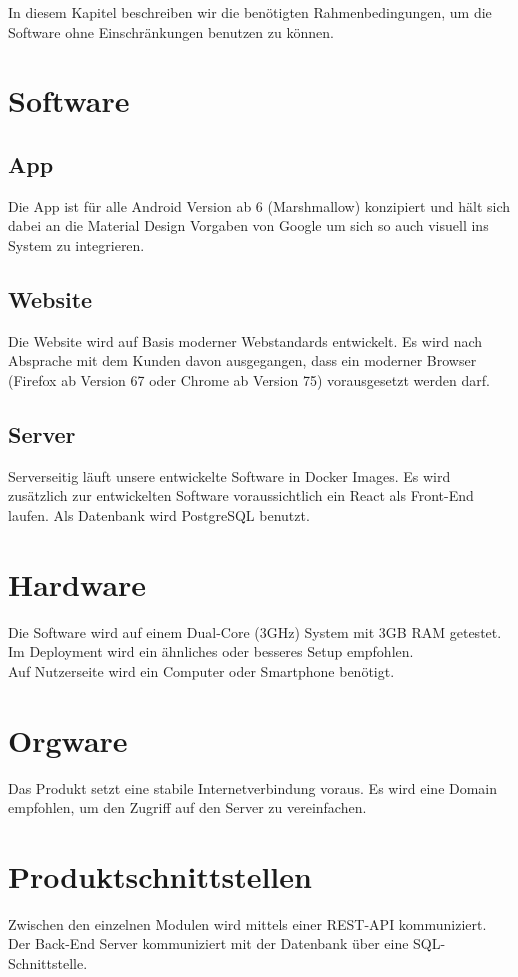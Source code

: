 In diesem Kapitel beschreiben wir die benötigten Rahmenbedingungen, um die Software ohne Einschränkungen benutzen zu können.

\section{Software}

\subsection*{App}
Die App ist für alle Android Version ab 6 (Marshmallow) konzipiert und hält sich dabei an die Material Design Vorgaben von Google um sich so auch visuell ins System zu integrieren.

\subsection*{Website}
Die Website wird auf Basis moderner Webstandards entwickelt. Es wird nach Absprache mit dem Kunden davon ausgegangen, dass ein moderner Browser (Firefox ab Version 67 oder Chrome ab Version 75) vorausgesetzt werden darf.

\subsection*{Server} 
Serverseitig läuft unsere entwickelte Software in Docker Images. Es wird zusätzlich zur entwickelten Software voraussichtlich ein React als Front-End laufen.
Als Datenbank wird PostgreSQL benutzt.

\section{Hardware}
Die Software wird auf einem Dual-Core (3GHz) System mit 3GB RAM getestet. Im Deployment wird ein ähnliches oder besseres Setup empfohlen.\\
Auf Nutzerseite wird ein Computer oder Smartphone benötigt. 
\section{Orgware}

Das Produkt setzt eine stabile Internetverbindung voraus. Es wird eine Domain empfohlen, um den Zugriff auf den Server zu vereinfachen.

\section{Produktschnittstellen}
Zwischen den einzelnen Modulen wird mittels einer REST-API kommuniziert. Der Back-End Server kommuniziert mit der Datenbank über eine SQL-Schnittstelle.
